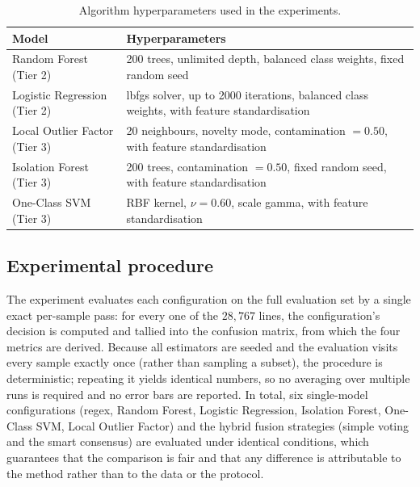 \documentclass[12pt,a4paper]{report}
\begin{document}
\begin{table}[ht]
  \centering
  \caption{Algorithm hyperparameters used in the experiments.}
  \label{tab:hyper}
  \renewcommand{\arraystretch}{1.35}
  \setlength{\tabcolsep}{8pt}
  \footnotesize
  \begin{tabular}{|l|p{8.2cm}|}
    \hline
    \textbf{Model} & \textbf{Hyperparameters} \\
    \hline
    Random Forest (Tier 2) & 200 trees, unlimited depth, balanced class
    weights, fixed random seed \\
    \hline
    Logistic Regression (Tier 2) & lbfgs solver, up to 2000 iterations,
    balanced class weights, with feature standardisation \\
    \hline
    Local Outlier Factor (Tier 3) & 20 neighbours, novelty mode,
    contamination $=0.50$, with feature standardisation \\
    \hline
    Isolation Forest (Tier 3) & 200 trees, contamination $=0.50$, fixed
    random seed, with feature standardisation \\
    \hline
    One-Class SVM (Tier 3) & RBF kernel, $\nu = 0.60$, scale gamma, with
    feature standardisation \\
    \hline
  \end{tabular}
\end{table}

\subsection{Experimental procedure}
\label{sec:sim-procedure}

The experiment evaluates each configuration on the full evaluation set by a
single exact per-sample pass: for every one of the $28{,}767$ lines, the
configuration's decision is computed and tallied into the confusion matrix,
from which the four metrics are derived. Because all estimators are seeded
and the evaluation visits every sample exactly once (rather than sampling a
subset), the procedure is deterministic; repeating it yields identical
numbers, so no averaging over multiple runs is required and no error bars are
reported. In total, six single-model configurations (regex, Random Forest,
Logistic Regression, Isolation Forest, One-Class SVM, Local Outlier Factor)
and the hybrid fusion strategies (simple voting and the smart consensus) are
evaluated under identical conditions, which guarantees that the comparison is
fair and that any difference is attributable to the method rather than to the
data or the protocol.
\end{document}
